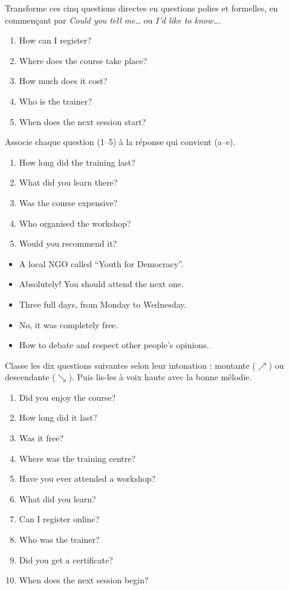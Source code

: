 \documentclass[11pt]{article}
\begin{document}
\begin{exercice}
Transforme ces cinq questions directes en questions polies et formelles, en commençant par \emph{Could you tell me…} ou \emph{I'd like to know…}.
\begin{enumerate}
\item How can I register?
\item Where does the course take place?
\item How much does it cost?
\item Who is the trainer?
\item When does the next session start?
\end{enumerate}
\end{exercice}

\begin{exercice}
Associe chaque question (1--5) à la réponse qui convient (a--e).
\begin{enumerate}
\item How long did the training last?
\item What did you learn there?
\item Was the course expensive?
\item Who organised the workshop?
\item Would you recommend it?
\end{enumerate}
\begin{itemize}
\item[a)] A local NGO called “Youth for Democracy”.
\item[b)] Absolutely! You should attend the next one.
\item[c)] Three full days, from Monday to Wednesday.
\item[d)] No, it was completely free.
\item[e)] How to debate and respect other people's opinions.
\end{itemize}
\end{exercice}

\begin{exercice}
Classe les dix questions suivantes selon leur intonation : montante ($\nearrow$) ou descendante ($\searrow$). Puis lis-les à voix haute avec la bonne mélodie.
\begin{enumerate}
\item Did you enjoy the course?
\item How long did it last?
\item Was it free?
\item Where was the training centre?
\item Have you ever attended a workshop?
\item What did you learn?
\item Can I register online?
\item Who was the trainer?
\item Did you get a certificate?
\item When does the next session begin?
\end{enumerate}
\end{exercice}
\end{document}

